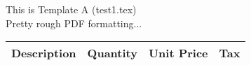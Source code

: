 \documentclass{article}
\begin{document}
\centering
This is Template A (test1.tex)\\
Pretty rough PDF formatting...

\begin{table}[h]
\centering
\begin{tabular}{cccc}

\hline
Description & Quantity & Unit Price & Tax \\
\hline
\end{tabular}
\end{table}
\end{document}
